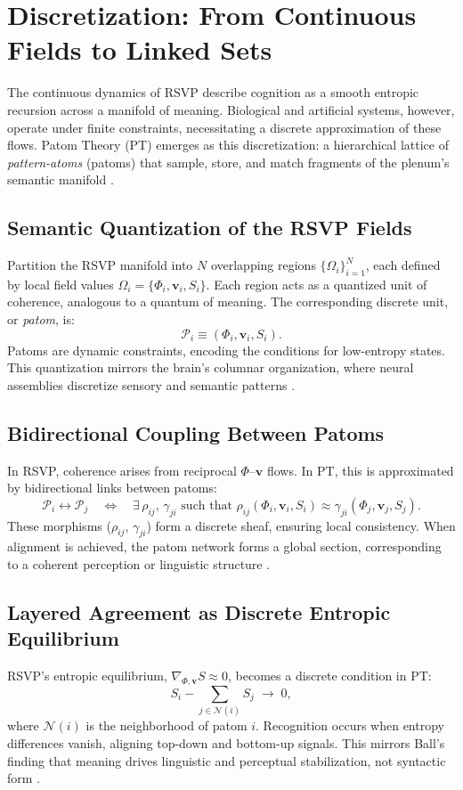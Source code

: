 \documentclass[11pt]{article}
\begin{document}
\section{Discretization: From Continuous Fields to Linked Sets}
The continuous dynamics of RSVP describe cognition as a smooth entropic recursion across a manifold of meaning. Biological and artificial systems, however, operate under finite constraints, necessitating a discrete approximation of these flows. Patom Theory (PT) emerges as this discretization: a hierarchical lattice of \textit{pattern-atoms} (patoms) that sample, store, and match fragments of the plenum’s semantic manifold \citep{ball2020patom}.

\subsection{Semantic Quantization of the RSVP Fields}
Partition the RSVP manifold into $N$ overlapping regions $\{\Omega_i\}_{i=1}^N$, each defined by local field values $\Omega_i = \{\Phi_i, \mathbf{v}_i, S_i\}$. Each region acts as a quantized unit of coherence, analogous to a quantum of meaning. The corresponding discrete unit, or \textit{patom}, is:
\[
\mathcal{P}_i \equiv (\Phi_i, \mathbf{v}_i, S_i).
\]
Patoms are dynamic constraints, encoding the conditions for low-entropy states. This quantization mirrors the brain’s columnar organization, where neural assemblies discretize sensory and semantic patterns \citep{seung2012connectome, hoffman1998visual}.

\subsection{Bidirectional Coupling Between Patoms}
In RSVP, coherence arises from reciprocal $\Phi$--$\mathbf{v}$ flows. In PT, this is approximated by bidirectional links between patoms:
\[
\mathcal{P}_i \leftrightarrow \mathcal{P}_j
\quad \Longleftrightarrow \quad
\exists\, \rho_{ij},\, \gamma_{ji}
\text{ such that }
\rho_{ij}(\Phi_i,\mathbf{v}_i,S_i)
\approx
\gamma_{ji}(\Phi_j,\mathbf{v}_j,S_j).
\]
These morphisms ($\rho_{ij}$, $\gamma_{ji}$) form a discrete sheaf, ensuring local consistency. When alignment is achieved, the patom network forms a global section, corresponding to a coherent perception or linguistic structure \citep{everaert2011semiotics, jackendoff2012semantics}.

\subsection{Layered Agreement as Discrete Entropic Equilibrium}
RSVP’s entropic equilibrium, $\nabla_{\!\Phi,\mathbf{v}} S \approx 0$, becomes a discrete condition in PT:
\[
S_i - \sum_{j\in \mathcal{N}(i)} S_j \;\to\; 0,
\]
where $\mathcal{N}(i)$ is the neighborhood of patom $i$. Recognition occurs when entropy differences vanish, aligning top-down and bottom-up signals. This mirrors Ball’s finding that meaning drives linguistic and perceptual stabilization, not syntactic form \citep{ball2015speech, ball2017babitasks}.
\end{document}
